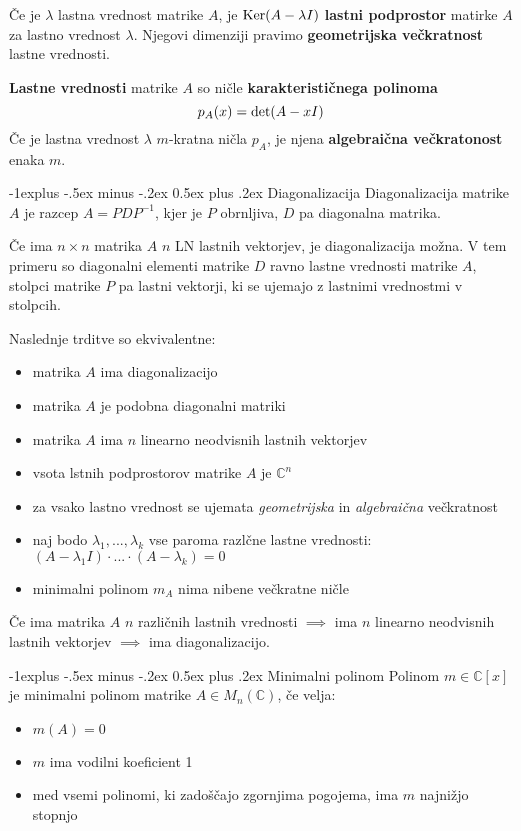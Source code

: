 \documentclass[a4paper,landscape]{article}
\makeatletter
\renewcommand{\subsection}{\@startsection{subsection}{2}{0mm}%
                                {-1explus -.5ex minus -.2ex}%
                                {0.5ex plus .2ex}%
                                {\normalfont\normalsize\bfseries}}
\makeatother
\begin{document}
\begin{multicols}{3}
Če je $\lambda$ lastna vrednost matrike $A$, je $\textmd{Ker}(A-\lambda I)$ \textbf{lastni podprostor} matirke $A$ za lastno vrednost $\lambda$.
Njegovi dimenziji pravimo \textbf{geometrijska večkratnost} lastne vrednosti.

\textbf{Lastne vrednosti} matrike $A$ so ničle \textbf{karakterističnega polinoma} 
\[p_A(x) = \textmd{det}(A-xI)\]
Če je lastna vrednost $\lambda$ $m$-kratna ničla $p_A$, je njena \textbf{algebraična večkratonost} enaka $m$.

\subsection{Diagonalizacija}
Diagonalizacija matrike $A$ je razcep $A = PDP^{-1}$, kjer je $P$ obrnljiva, $D$ pa diagonalna matrika.

Če ima $n \times n$ matrika $A$ $n$ LN lastnih vektorjev, je diagonalizacija možna. V tem primeru so diagonalni elementi matrike $D$ ravno lastne vrednosti matrike $A$, stolpci matrike $P$ pa lastni vektorji, ki se ujemajo z lastnimi vrednostmi v stolpcih.

Naslednje trditve so ekvivalentne:
\begin{itemize}
    \item matrika $A$ ima diagonalizacijo
    \item matrika $A$ je podobna diagonalni matriki
    \item matrika $A$ ima $n$ linearno neodvisnih lastnih vektorjev
    \item vsota lstnih podprostorov matrike $A$ je $\mathbb{C}^n$
    \item za vsako lastno vrednost se ujemata \emph{geometrijska} in \emph{algebraična} večkratnost
    \item naj bodo $\lambda_1,..., \lambda_k$ vse paroma razlčne lastne vrednosti: $(A-\lambda_1 I)\cdot ... \cdot (A-\lambda_k) = 0$
    \item minimalni polinom $m_A$ nima nibene večkratne ničle
\end{itemize}

Če ima matrika $A$ $n$ različnih lastnih vrednosti $\implies$ ima $n$ linearno neodvisnih lastnih vektorjev $\implies$ ima diagonalizacijo.

\subsection{Minimalni polinom}
Polinom $m \in \mathbb{C}[x]$ je minimalni polinom matrike $A \in M_n(\mathbb{C})$, če velja:
\begin{itemize}
    \item $m(A) = 0$
    \item $m$ ima vodilni koeficient 1
    \item med vsemi polinomi, ki zadoščajo zgornjima pogojema, ima $m$ najnižjo stopnjo
\end{itemize}


\end{multicols}
\end{document}
